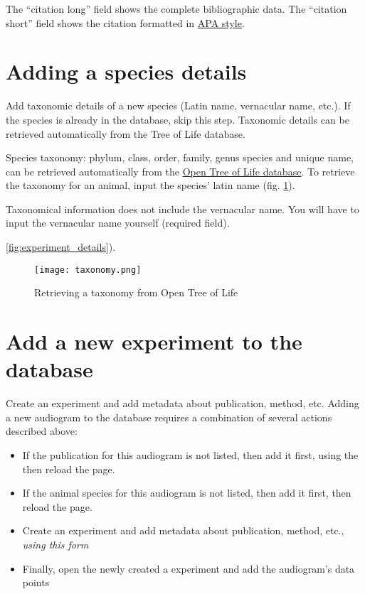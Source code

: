 \documentclass{article}
\begin{document}
The ``citation long'' field shows the complete bibliographic data. The ``citation short'' field shows the citation formatted in \href{https://apastyle.apa.org}{APA style}.

\section{Adding a species details}
Add taxonomic details of a new species (Latin name, vernacular name, etc.). If the species is already in the database, skip this step. Taxonomic details can be retrieved automatically from the Tree of Life database.

Species taxonomy: phylum, class, order, family, genus species and unique name, can be retrieved automatically from the \href{https://opentreeoflife.github.io}{Open Tree of Life database}. To retrieve the taxonomy for an animal, input the species' latin name (fig. \ref{fig:taxonomy}).

Taxonomical information does not include the vernacular name. You will have to input the vernacular name yourself (required field).

\ref{fig:experiment_details}).
\begin{figure}
\texttt{[image: taxonomy.png]}
\caption{Retrieving a taxonomy from Open Tree of Life}
\label{fig:taxonomy}
\end{figure}

\section{Add a new experiment to the database}
Create an experiment and add metadata about publication, method, etc.
Adding a new audiogram to the database requires a combination of several actions described above:

\begin{itemize}
\item{If the publication for this audiogram is not listed, then add it first, using the then reload the page.}
\item{If the animal species for this audiogram is not listed, then add it first, then reload the page.}
\item{Create an experiment and add metadata about publication, method, etc., \emph{using this form}}
\item{Finally, open the newly created a experiment and add the audiogram's data points}
\end{itemize}
\end{document}
